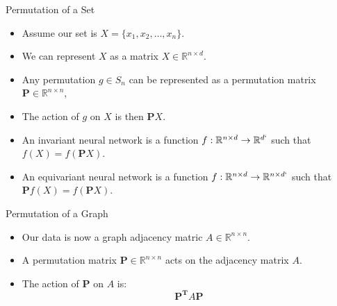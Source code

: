 \documentclass{beamer}
\begin{document}
\begin{frame}{Permutation of a Set}

    \begin{itemize}
        \setlength{\itemsep}{\fill}
        \item Assume our set is $X = \{x_1, x_2, \ldots, x_n\}$.
        \item We can represent $X$ as a matrix $X \in \mathbb{R}^{n \times d}$.
        \item Any permutation $g \in S_n$ can be represented as a permutation matrix $\boldsymbol{P} \in \mathbb{R}^{n \times n}$,
        \item The action of $g$ on $X$ is then $\boldsymbol{P} X$.
        \item An invariant neural network is a function $f: \mathbb{R}^{n \times d} \rightarrow \mathbb{R}^{d`}$ such that $f(X) = f(\boldsymbol{P}X)$.
        \item An equivariant neural network is a function $f: \mathbb{R}^{n \times d} \rightarrow \mathbb{R}^{n \times d`}$ such that $\boldsymbol{P}f(X) = f(\boldsymbol{P}X)$.
    \end{itemize}
    
\end{frame}


\begin{frame}{Permutation of a Graph}

    \begin{itemize}
        \setlength{\itemsep}{\fill}
        \item Our data is now a graph adjacency matric $A \in \mathbb{R}^{n \times n}$. 
        \item A permutation matrix $\boldsymbol{P} \in \mathbb{R}^{n \times n}$ acts on the adjacency matrix $A$.
        \item The action of $\boldsymbol{P}$ on $A$ is:
        \[ \boldsymbol{P^T}A\boldsymbol{P} \]
    \end{itemize}
    
\end{frame}
\end{document}

